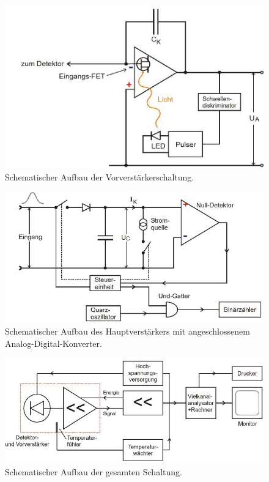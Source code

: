 \begin{figure}
	\centering
	\includegraphics[width=\linewidth-70pt,height=\textheight-70pt,keepaspectratio]{content/images/Schaltung.jpg}
	\caption{Schematischer Aufbau der Vorverstärkerschaltung\cite{V18}.}
	\label{fig:Schalt}
\end{figure}
\begin{figure}
	\centering
	\includegraphics[width=\linewidth-70pt,height=\textheight-70pt,keepaspectratio]{content/images/Schaltung2.jpg}
	\caption{Schematischer Aufbau des Hauptverstärkers mit angeschlossenem Analog-Digital-Konverter\cite{V18}.}
	\label{fig:Schalt2}
\end{figure}
\begin{figure}
	\centering
	\includegraphics[width=\linewidth-70pt,height=\textheight-70pt,keepaspectratio]{content/images/Schaltung3.jpg}
	\caption{Schematischer Aufbau der gesamten Schaltung\cite{V18}.}
	\label{fig:Schalt3}
\end{figure}
